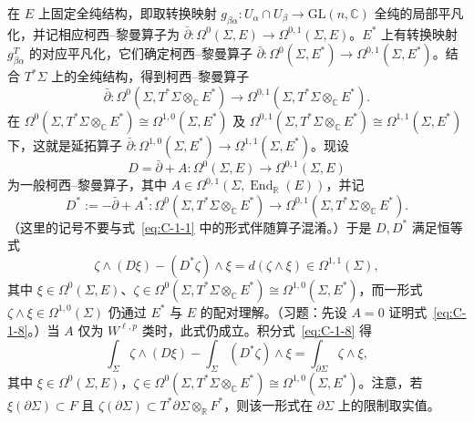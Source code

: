 在 $E$ 上固定全纯结构，即取转换映射 $g_{\beta\alpha}:U_\alpha\cap U_\beta\to\mathrm{GL}(n,\mathbb C)$ 全纯的局部平凡化，并记相应柯西–黎曼算子为 $\bar\partial:\Omega^0(\Sigma,E)\to\Omega^{0,1}(\Sigma,E)$。$E^*$ 上有转换映射 $g_{\beta\alpha}^{T}$ 的对应平凡化，它们确定柯西–黎曼算子 $\bar\partial:\Omega^0(\Sigma,E^*)\to\Omega^{0,1}(\Sigma,E^*)$。结合 $T^*\Sigma$ 上的全纯结构，得到柯西–黎曼算子
\[
  \bar\partial:\Omega^0(\Sigma,T^*\Sigma\otimes_{\mathbb C}E^*)
  \longrightarrow\Omega^{0,1}(\Sigma,T^*\Sigma\otimes_{\mathbb C}E^*).
\]
在 $\Omega^0(\Sigma,T^*\Sigma\otimes_{\mathbb C}E^*)\cong\Omega^{1,0}(\Sigma,E^*)$ 及 $\Omega^{0,1}(\Sigma,T^*\Sigma\otimes_{\mathbb C}E^*)\cong\Omega^{1,1}(\Sigma,E^*)$ 下，这就是延拓算子 $\bar\partial:\Omega^{1,0}(\Sigma,E^*)\to\Omega^{1,1}(\Sigma,E^*)$。现设
\[
  D=\bar\partial+A:\Omega^0(\Sigma,E)\longrightarrow\Omega^{0,1}(\Sigma,E)
\]
为一般柯西–黎曼算子，其中 $A\in\Omega^{0,1}(\Sigma,\operatorname{End}_{\mathbb R}(E))$，并记
\[
  D^*:=-\bar\partial+A^*:
  \Omega^0(\Sigma,T^*\Sigma\otimes_{\mathbb C}E^*)
  \longrightarrow\Omega^{0,1}(\Sigma,T^*\Sigma\otimes_{\mathbb C}E^*).
\]
（这里的记号不要与式~\eqref{eq:C-1-1} 中的形式伴随算子混淆。）于是 $D,D^*$ 满足恒等式
\begin{equation}\label{eq:C-1-8}
  \zeta\wedge(D\xi)-(D^*\zeta)\wedge\xi
  =d(\zeta\wedge\xi)\in\Omega^{1,1}(\Sigma),
\end{equation}
其中 $\xi\in\Omega^0(\Sigma,E)$、$\zeta\in\Omega^0(\Sigma,T^*\Sigma\otimes_{\mathbb C}E^*)\cong\Omega^{1,0}(\Sigma,E^*)$，而一形式 $\zeta\wedge\xi\in\Omega^{1,0}(\Sigma)$ 仍通过 $E^*$ 与 $E$ 的配对理解。（习题：先设 $A=0$ 证明式~\eqref{eq:C-1-8}。）当 $A$ 仅为 $W^{\ell,p}$ 类时，此式仍成立。积分式~\eqref{eq:C-1-8} 得
\begin{equation}\label{eq:C-1-9}
  \int_\Sigma\zeta\wedge(D\xi)
  -\int_\Sigma(D^*\zeta)\wedge\xi
  =\int_{\partial\Sigma}\zeta\wedge\xi,
\end{equation}
其中 $\xi\in\Omega^0(\Sigma,E)$，$\zeta\in\Omega^0(\Sigma,T^*\Sigma\otimes_{\mathbb C}E^*)\cong\Omega^{1,0}(\Sigma,E^*)$。注意，若 $\xi(\partial\Sigma)\subset F$ 且 $\zeta(\partial\Sigma)\subset T^*\partial\Sigma\otimes_{\mathbb R}F^*$，则该一形式在 $\partial\Sigma$ 上的限制取实值。

